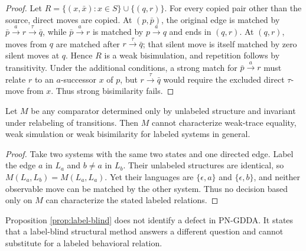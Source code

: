 \documentclass{ws-jbcb}
\numberwithin{equation}{section}
\newcommand{\TAU}{\tau}
\begin{document}
\begin{proof}
Let
$R=\{(x,\bar x):x\in S\}\cup\{(q,r)\}$. For every copied pair other than the
source, direct moves are copied. At $(p,\bar p)$, the original edge is matched
by $\bar p\xrightarrow{a}r\xrightarrow{\TAU}\bar q$, while
$\bar p\xrightarrow{a}r$ is matched by $p\xrightarrow{a}q$ and ends in
$(q,r)$. At $(q,r)$, moves from $q$ are matched after
$r\xrightarrow{\TAU}\bar q$; that silent move is itself matched by zero silent
moves at $q$. Hence $R$ is a weak bisimulation, and repetition follows by
transitivity. Under the additional conditions, a strong match for
$\bar p\xrightarrow{a}r$ must relate $r$ to an $a$-successor $x$ of $p$, but
$r\xrightarrow{\TAU}\bar q$ would require the excluded direct $\TAU$-move from
$x$. Thus strong bisimilarity fails.
\end{proof}

\begin{proposition}
\label{prop:label-blind}
Let $M$ be any comparator determined only by unlabeled structure and invariant
under relabeling of transitions. Then $M$ cannot characterize weak-trace
equality, weak simulation or weak bisimilarity for labeled systems in general.
\end{proposition}

\begin{proof}
Take two systems with the same two states and one directed edge. Label the edge
$a$ in $L_a$ and $b\neq a$ in $L_b$. Their unlabeled structures are identical,
so $M(L_a,L_b)=M(L_a,L_a)$. Yet their languages are
$\{\epsilon,a\}$ and $\{\epsilon,b\}$, and neither observable move can be
matched by the other system. Thus no decision based only on $M$ can characterize
the stated labeled relations.
\end{proof}

Proposition \ref{prop:label-blind} does not identify a defect in PN-GDDA. It
states that a label-blind structural method answers a different question and
cannot substitute for a labeled behavioral relation.
\end{document}
